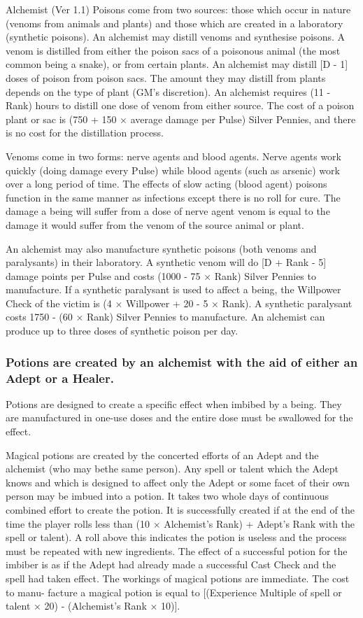 \begin{Chapter}{Alchemist (Ver 1.1)}
Poisons come from two sources: those which occur in nature (venoms
from animals and plants) and those which are created in a laboratory
(synthetic poisons).  An alchemist may distill venoms and synthesise
poisons.  A venom is distilled from either the poison sacs of a
poisonous animal (the most common being a snake), or from certain
plants.  An alchemist may distill [D - 1] doses of poison from poison
sacs.  The amount they may distill from plants depends on the type of
plant (GM’s discretion).  An alchemist requires (11 - Rank) hours to
distill one dose of venom from either source.  The cost of a poison
plant or sac is (750 + 150 × average damage per Pulse) Silver Pennies,
and there is no cost for the distillation process.

Venoms come in two forms: nerve agents and blood agents.  Nerve agents
work quickly (doing damage every Pulse) while blood agents (such as
arsenic) work over a long period of time.  The effects of slow acting
(blood agent) poisons function in the same manner as infections except
there is no roll for cure. The damage a being will suffer from a dose
of nerve agent venom is equal to the damage it would suffer from the
venom of the source animal or plant.

An alchemist may also manufacture synthetic poisons (both venoms and
paralysants) in their laboratory. A synthetic venom will do [D + Rank
  - 5] damage points per Pulse and costs (1000 - 75 × Rank) Silver
Pennies to manufacture. If a synthetic paralysant is used to affect a
being, the Willpower Check of the victim is (4 × Willpower + 20 - 5 ×
Rank).  A synthetic paralysant costs 1750 - (60 × Rank) Silver Pennies
to manufacture. An alchemist can produce up to three doses of
synthetic poison per day.

\subsubsection{Potions are created by an alchemist with the aid of either an Adept or
a Healer.}

Potions are designed to create a specific effect when imbibed by a
being.  They are manufactured in one-use doses and the entire dose
must be swallowed for the effect.

Magical potions are created by the concerted efforts of an Adept and
the alchemist (who may bethe same person).  Any spell or talent which
the Adept knows and which is designed to affect only the Adept or some
facet of their own person may be imbued into a potion. It takes two
whole days of continuous combined effort to create the potion.  It is
successfully created if at the end of the time the player rolls less
than (10 × Alchemist’s Rank) + Adept’s Rank with the spell or
talent). A roll above this indicates the potion is useless and the
process must be repeated with new ingredients.  The effect of a
successful potion for the imbiber is as if the Adept had already made
a successful Cast Check and the spell had taken effect.  The workings
of magical potions are immediate.  The cost to manu- facture a magical
potion is equal to [(Experience Multiple of spell or talent × 20) -
  (Alchemist’s Rank × 10)].


\end{Chapter}
